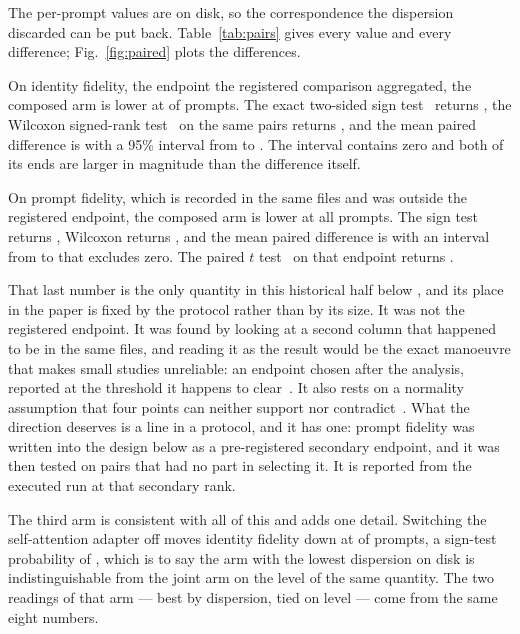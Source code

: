 The per-prompt values are on disk, so the correspondence the dispersion
discarded can be put back. Table~\ref{tab:pairs} gives every value and every
difference; Fig.~\ref{fig:paired} plots the differences.

On identity fidelity, the endpoint the registered comparison aggregated, the
composed arm is lower at \IdentityDown{} of \NPairs{} prompts. The exact
two-sided sign test~\cite{dixon1946sign} returns \IdentitySignP{}, the Wilcoxon
signed-rank test~\cite{wilcoxon1945individual} on the same pairs returns
\IdentityWilcoxP{}, and the mean paired difference is \IdentityDiff{} with a
95\% interval from \IdentityLower{} to \IdentityUpper{}. The interval contains
zero and both of its ends are larger in magnitude than the difference itself.

On prompt fidelity, which is recorded in the same files and was outside the
registered endpoint, the composed arm is lower at all \PromptDown{} prompts.
The sign test returns \PromptSignP{}, Wilcoxon returns \PromptWilcoxP{}, and
the mean paired difference is \PromptDiff{} with an interval from
\PromptLower{} to \PromptUpper{} that excludes zero. The paired $t$
test~\cite{student1908probable} on that endpoint returns \PromptTP{}.

That last number is the only quantity in this historical half below \Alpha{},
and its place in the paper is fixed by the protocol rather than by its size.
It was not the registered endpoint. It was found by looking at a second column
that happened to be in the same files, and reading it as the result would be
the exact manoeuvre that makes small studies unreliable: an endpoint chosen
after the analysis, reported at the threshold it happens to
clear~\cite{simmons2011false,gelman2014garden}. It also rests on a normality
assumption that four points can neither support nor
contradict~\cite{amrhein2019retire}. What the direction deserves is a line in a
protocol, and it has one: prompt fidelity was written into the design below as
a pre-registered secondary endpoint, and it was then tested on pairs that had
no part in selecting it. It is reported from the executed run at that
secondary rank.

The third arm is consistent with all of this and adds one detail. Switching the
self-attention adapter off moves identity fidelity down at \IdonDown{} of
\NPairs{} prompts, a sign-test probability of \IdonSignP{}, which is to say the
arm with the lowest dispersion on disk is indistinguishable from the joint arm
on the level of the same quantity. The two readings of that arm --- best by
dispersion, tied on level --- come from the same eight numbers.

